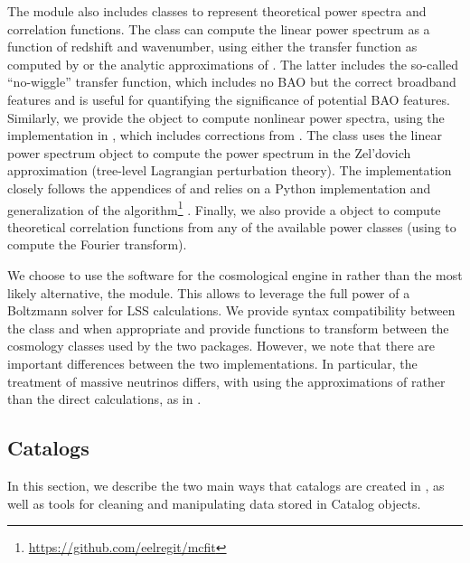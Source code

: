 The  module also includes classes to represent
theoretical power spectra and correlation functions. The 
class can compute the linear power spectrum as a function of redshift
and wavenumber, using either the transfer function as computed by
 or the analytic approximations of \citet{Eisenstein:1998b}.
The latter includes the so-called ``no-wiggle'' transfer function,
which includes no BAO but the correct broadband features and is
useful for quantifying the significance of potential BAO features.
Similarly, we provide the  object to compute nonlinear
power spectra, using the  implementation in 
\citep{Smith:2003}, which includes corrections from \citet{Takahashi:2012}.
The  class uses the linear power spectrum object to
compute the power spectrum in the Zel'dovich approximation (tree-level
Lagrangian perturbation theory). The implementation closely follows the
appendices of \citet{Vlah:2015} and relies on a Python implementation and
generalization of the
 algorithm\footnote{\url{https://github.com/eelregit/mcfit}}
\citep{Hamilton:2000}. Finally, we also provide
a  object to compute theoretical
correlation functions from any of the available power classes
(using  to compute the Fourier transform).

We choose to use the  software for the cosmological engine in
\nbkit{} rather than the most likely alternative, the 
module. This allows \nbkit{} to leverage the full power of a Boltzmann solver
for LSS calculations. We provide syntax compatibility between the
 class and
\astropy{} when appropriate and provide functions to transform between the
cosmology classes used by the two packages. However, we note that there are
important differences between the two implementations. In particular, the
treatment of massive neutrinos differs, with \astropy{} using the
approximations of \citet{Komatsu:2011} rather than the direct calculations,
as in .


\subsection{Catalogs}
\label{sec:catalog-details}

In this section, we describe the two main ways that catalogs are created
in \nbkit{}, as well as tools for cleaning and manipulating data stored
in Catalog objects.

